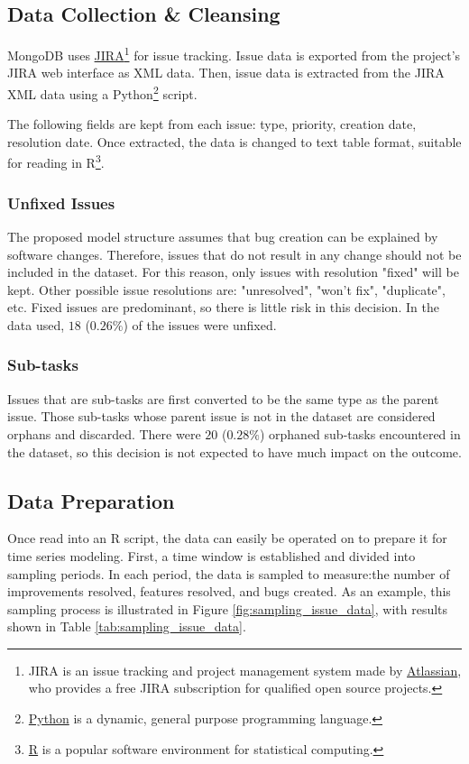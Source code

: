 \documentclass[a4paper]{scrartcl}
\begin{document}
\subsection*{Data Collection \& Cleansing}
MongoDB uses \href{https://www.atlassian.com/software/jira}{JIRA}\footnote{JIRA is an issue tracking and project management system made by \href{https://www.atlassian.com/}{Atlassian}, who provides a free JIRA subscription for qualified open source projects.} for issue tracking. Issue data is exported from the project's JIRA web interface as XML data. Then, issue data is extracted from the JIRA XML data using a Python\footnote{\href{https://www.python.org/}{Python} is a dynamic, general purpose programming language.} script.

The following fields are kept from each issue: type, priority, creation date, resolution date.  Once extracted, the data is changed to text table format, suitable for reading in R\footnote{\href{http://www.r-project.org/}{R} is a popular software environment for statistical computing.}.

\subsubsection*{Unfixed Issues}
The proposed model structure assumes that bug creation can be explained by software changes. Therefore, issues that do not result in any change should not be included in the dataset. For this reason, only issues with resolution "fixed" will be kept. Other possible issue resolutions are: "unresolved", "won't fix", "duplicate", etc. Fixed issues are predominant, so there is little risk in this decision. In the data used, $18$ ($0.26\%$) of the issues were unfixed. 

\subsubsection*{Sub-tasks}
Issues that are sub-tasks are first converted to be the same type as the parent issue. Those sub-tasks whose parent issue is not in the dataset are considered orphans and discarded. There were $20$ ($0.28\%$) orphaned sub-tasks encountered in the dataset, so this decision is not expected to have much impact on the outcome.

\subsection*{Data Preparation}
Once read into an R script, the data can easily be operated on to prepare it for time series modeling. First, a time window is established and divided into sampling periods. In each period, the data is sampled to measure:the number of improvements resolved, features resolved, and bugs created. As an example, this sampling process is illustrated in Figure \ref{fig:sampling_issue_data}, with results shown in Table \ref{tab:sampling_issue_data}.
\end{document}
